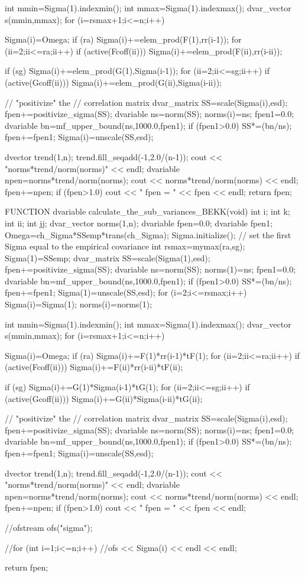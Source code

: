   int mmin=Sigma(1).indexmin(); 
  int mmax=Sigma(1).indexmax(); 
  dvar_vector s(mmin,mmax);
  for (i=rsmax+1;i<=n;i++) {
    Sigma(i)=Omega;
    if (ra) Sigma(i)+=elem_prod(F(1),rr(i-1));
    for (ii=2;ii<=ra;ii++) {
      if (active(Fcoff(ii)))
        Sigma(i)+=elem_prod(F(ii),rr(i-ii));
    }
    
    if (sg) Sigma(i)+=elem_prod(G(1),Sigma(i-1));
    for (ii=2;ii<=sg;ii++) {
      if (active(Gcoff(ii)))
        Sigma(i)+=elem_prod(G(ii),Sigma(i-ii));
    }
    
    // "positivize" the
    // correlation matrix
    dvar_matrix SS=scale(Sigma(i),esd);
    fpen+=positivize_sigma(SS);
    dvariable ns=norm(SS);
    norms(i)=ns;
    fpen1=0.0;
    dvariable bn=mf_upper_bound(ns,1000.0,fpen1);
    if (fpen1>0.0) {
      SS*=(bn/ns);
      fpen+=fpen1;
    }
    Sigma(i)=unscale(SS,esd);
  }
  dvector trend(1,n);
  trend.fill_seqadd(-1,2.0/(n-1));
  cout << "norms*trend/norm(norms)" << endl; 
  dvariable npen=norms*trend/norm(norms); 
  cout << norms*trend/norm(norms) << endl; 
  fpen+=npen;
  if (fpen>1.0)
    cout << " fpen = " << fpen << endl;
  return fpen;
  
FUNCTION dvariable calculate_the_sub_variances_BEKK(void)
  int i; int k; int ii; int jj;
  dvar_vector norms(1,n);
  dvariable fpen=0.0;
  dvariable fpen1;
  Omega=ch_Sigma*SSemp*trans(ch_Sigma);
  Sigma.initialize();
  // set the first Sigma equal to the empirical covariance
  int rsmax=mymax(ra,sg);
  Sigma(1)=SSemp;
  dvar_matrix SS=scale(Sigma(1),esd);
  fpen+=positivize_sigma(SS);
  dvariable ns=norm(SS);
   norms(1)=ns;
  fpen1=0.0;
  dvariable bn=mf_upper_bound(ns,1000.0,fpen1);
  if (fpen1>0.0) {
    SS*=(bn/ns);
    fpen+=fpen1;
  }
  Sigma(1)=unscale(SS,esd);
  for (i=2;i<=rsmax;i++) {
    Sigma(i)=Sigma(1);
    norms(i)=norms(1);
  }

  int mmin=Sigma(1).indexmin(); 
  int mmax=Sigma(1).indexmax(); 
  dvar_vector s(mmin,mmax);
  for (i=rsmax+1;i<=n;i++) {
    Sigma(i)=Omega;
    if (ra) Sigma(i)+=F(1)*rr(i-1)*tF(1);
    for (ii=2;ii<=ra;ii++) {
      if (active(Fcoff(ii)))
        Sigma(i)+=F(ii)*rr(i-ii)*tF(ii);
    }
    
    if (sg) Sigma(i)+=G(1)*Sigma(i-1)*tG(1);
    for (ii=2;ii<=sg;ii++) {
      if (active(Gcoff(ii)))
        Sigma(i)+=G(ii)*Sigma(i-ii)*tG(ii);
    }
    
    // "positivize" the
    // correlation matrix
    dvar_matrix SS=scale(Sigma(i),esd);
    fpen+=positivize_sigma(SS);
    dvariable ns=norm(SS);
    norms(i)=ns;
    fpen1=0.0;
    dvariable bn=mf_upper_bound(ns,1000.0,fpen1);
    if (fpen1>0.0) {
      SS*=(bn/ns);
      fpen+=fpen1;
    }
    Sigma(i)=unscale(SS,esd);
  }
  dvector trend(1,n);
  trend.fill_seqadd(-1,2.0/(n-1));
  cout << "norms*trend/norm(norms)" << endl; 
  dvariable npen=norms*trend/norm(norms); 
  cout << norms*trend/norm(norms) << endl; 
  fpen+=npen;
  if (fpen>1.0)
    cout << " fpen = " << fpen << endl;
  {
    //ofstream ofs("sigma");
    
    //for (int i=1;i<=n;i++)
      //ofs << Sigma(i) << endl << endl;
  }
  return fpen;
  
